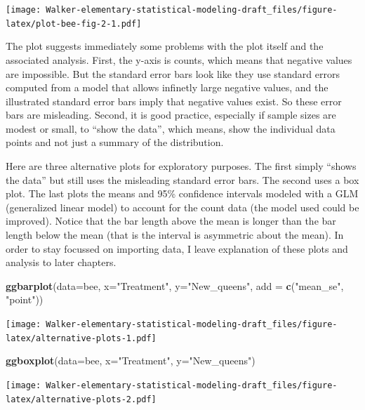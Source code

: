 \documentclass[]{book}
\newenvironment{Shaded}{\begin{snugshade}}{\end{snugshade}}
\newcommand{\KeywordTok}[1]{\textcolor[rgb]{0.13,0.29,0.53}{\textbf{#1}}}
\newcommand{\DataTypeTok}[1]{\textcolor[rgb]{0.13,0.29,0.53}{#1}}
\newcommand{\StringTok}[1]{\textcolor[rgb]{0.31,0.60,0.02}{#1}}
\newcommand{\NormalTok}[1]{#1}
\theoremstyle{definition}
\theoremstyle{definition}
\theoremstyle{definition}
\theoremstyle{remark}
\begin{document}
\texttt{[image: Walker-elementary-statistical-modeling-draft\_files/figure-latex/plot-bee-fig-2-1.pdf]}

The plot suggests immediately some problems with the plot itself and the
associated analysis. First, the y-axis is counts, which means that
negative values are impossible. But the standard error bars look like
they use standard errors computed from a model that allows infinetly
large negative values, and the illustrated standard error bars imply
that negative values exist. So these error bars are misleading. Second,
it is good practice, especially if sample sizes are modest or small, to
``show the data'', which means, show the individual data points and not
just a summary of the distribution.

Here are three alternative plots for exploratory purposes. The first
simply ``shows the data'' but still uses the misleading standard error
bars. The second uses a box plot. The last plots the means and 95\%
confidence intervals modeled with a GLM (generalized linear model) to
account for the count data (the model used could be improved). Notice
that the bar length above the mean is longer than the bar length below
the mean (that is the interval is asymmetric about the mean). In order
to stay focussed on importing data, I leave explanation of these plots
and analysis to later chapters.

\begin{Shaded}
\begin{Highlighting}[]
\KeywordTok{ggbarplot}\NormalTok{(}\DataTypeTok{data=}\NormalTok{bee, }\DataTypeTok{x=}\StringTok{"Treatment"}\NormalTok{, }\DataTypeTok{y=}\StringTok{"New_queens"}\NormalTok{, }\DataTypeTok{add =} \KeywordTok{c}\NormalTok{(}\StringTok{"mean_se"}\NormalTok{, }\StringTok{"point"}\NormalTok{))}
\end{Highlighting}
\end{Shaded}

\texttt{[image: Walker-elementary-statistical-modeling-draft\_files/figure-latex/alternative-plots-1.pdf]}

\begin{Shaded}
\begin{Highlighting}[]
\KeywordTok{ggboxplot}\NormalTok{(}\DataTypeTok{data=}\NormalTok{bee, }\DataTypeTok{x=}\StringTok{"Treatment"}\NormalTok{, }\DataTypeTok{y=}\StringTok{"New_queens"}\NormalTok{)}
\end{Highlighting}
\end{Shaded}

\texttt{[image: Walker-elementary-statistical-modeling-draft\_files/figure-latex/alternative-plots-2.pdf]}
\end{document}

